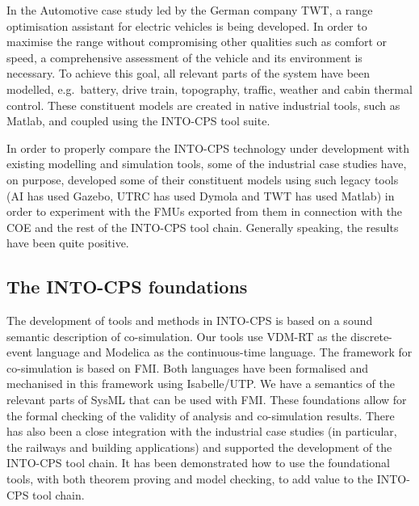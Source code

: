 In the Automotive case study led by the German company TWT, a range optimisation assistant for electric vehicles is being developed. In order to maximise the range without compromising other qualities such as comfort or speed, a comprehensive assessment of the vehicle and its environment is necessary. To achieve this goal, all relevant parts of the system have been modelled, e.g.\ battery, drive train, topography, traffic, weather and cabin thermal control. These constituent models are created in native industrial tools, such as Matlab, and coupled using the INTO-CPS tool suite.

In order to properly compare the INTO-CPS technology under development with existing modelling and simulation tools, some of the industrial case studies have, on purpose, developed some of their constituent models using such legacy tools (AI has used Gazebo, UTRC has used Dymola and TWT has used Matlab) in order to experiment with the FMUs exported from them in connection with the COE and the rest of the INTO-CPS tool chain. Generally speaking, the results have been quite positive. 

\subsection{The INTO-CPS foundations}

The development of tools and methods in INTO-CPS is based on a sound semantic description of co-simulation. Our tools use VDM-RT as the discrete-event language and Modelica as the continuous-time language. The framework for co-simulation is based on FMI. Both languages have been formalised and mechanised in this framework using Isabelle/UTP. We have a semantics of the relevant parts of SysML that can be used with FMI. These foundations allow for the formal checking of the validity of analysis and co-simulation results. There has also been a close integration with the industrial case studies (in particular, the railways and building applications) and supported the development of the INTO-CPS tool chain. It has been demonstrated how to use the foundational tools, with both theorem proving and model checking, to add value to the INTO-CPS tool chain.

